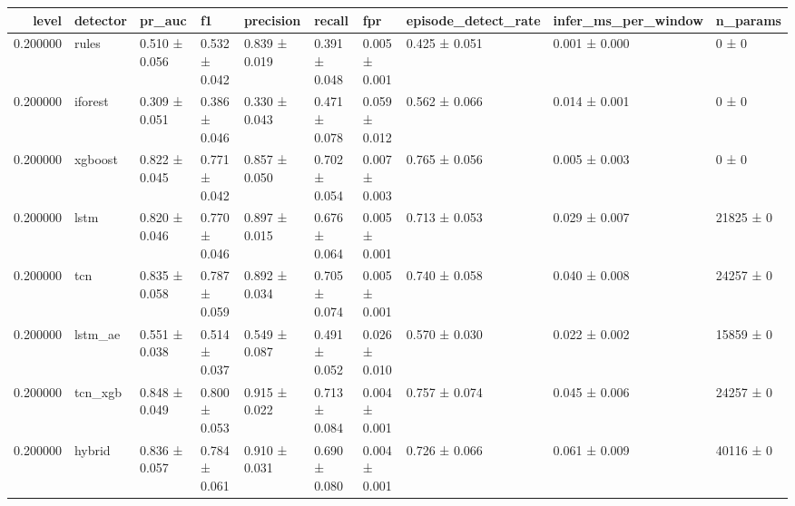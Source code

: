 \begin{tabular}{rlllllllll}
\toprule
level & detector & pr\_auc & f1 & precision & recall & fpr & episode\_detect\_rate & infer\_ms\_per\_window & n\_params \\
\midrule
0.200000 & rules & 0.510 ± 0.056 & 0.532 ± 0.042 & 0.839 ± 0.019 & 0.391 ± 0.048 & 0.005 ± 0.001 & 0.425 ± 0.051 & 0.001 ± 0.000 & 0 ± 0 \\
0.200000 & iforest & 0.309 ± 0.051 & 0.386 ± 0.046 & 0.330 ± 0.043 & 0.471 ± 0.078 & 0.059 ± 0.012 & 0.562 ± 0.066 & 0.014 ± 0.001 & 0 ± 0 \\
0.200000 & xgboost & 0.822 ± 0.045 & 0.771 ± 0.042 & 0.857 ± 0.050 & 0.702 ± 0.054 & 0.007 ± 0.003 & 0.765 ± 0.056 & 0.005 ± 0.003 & 0 ± 0 \\
0.200000 & lstm & 0.820 ± 0.046 & 0.770 ± 0.046 & 0.897 ± 0.015 & 0.676 ± 0.064 & 0.005 ± 0.001 & 0.713 ± 0.053 & 0.029 ± 0.007 & 21825 ± 0 \\
0.200000 & tcn & 0.835 ± 0.058 & 0.787 ± 0.059 & 0.892 ± 0.034 & 0.705 ± 0.074 & 0.005 ± 0.001 & 0.740 ± 0.058 & 0.040 ± 0.008 & 24257 ± 0 \\
0.200000 & lstm\_ae & 0.551 ± 0.038 & 0.514 ± 0.037 & 0.549 ± 0.087 & 0.491 ± 0.052 & 0.026 ± 0.010 & 0.570 ± 0.030 & 0.022 ± 0.002 & 15859 ± 0 \\
0.200000 & tcn\_xgb & 0.848 ± 0.049 & 0.800 ± 0.053 & 0.915 ± 0.022 & 0.713 ± 0.084 & 0.004 ± 0.001 & 0.757 ± 0.074 & 0.045 ± 0.006 & 24257 ± 0 \\
0.200000 & hybrid & 0.836 ± 0.057 & 0.784 ± 0.061 & 0.910 ± 0.031 & 0.690 ± 0.080 & 0.004 ± 0.001 & 0.726 ± 0.066 & 0.061 ± 0.009 & 40116 ± 0 \\
\bottomrule
\end{tabular}
